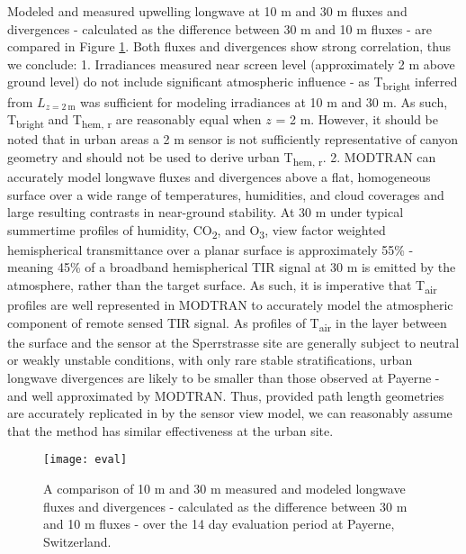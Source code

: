 Modeled and measured upwelling longwave at 10 \si{m} and 30 \si{m} fluxes and divergences - calculated as the difference between 30 \si{\meter} and 10 \si{\meter} fluxes - are compared in Figure \ref{fluxes}. Both fluxes and divergences show strong correlation, thus we conclude: 1. Irradiances measured near screen level (approximately 2 \si{\meter} above ground level) do not include significant atmospheric influence - as T\textsubscript{bright} inferred from $L_{z=2~\si{\meter}}$ was sufficient for modeling irradiances at 10 \si{m} and 30 \si{m}. As such, T\textsubscript{bright} and T\textsubscript{hem, r} are reasonably equal when $z$ = 2 \si{m}. However, it should be noted that in urban areas a 2 \si{m} sensor is not sufficiently representative of canyon geometry and should not be used to derive urban T\textsubscript{hem, r}. 2. MODTRAN can accurately model longwave fluxes and divergences above a flat, homogeneous surface over a wide range of temperatures, humidities, and cloud coverages and large resulting contrasts in near-ground stability. At 30 \si{\meter} under typical summertime profiles of humidity, CO\textsubscript{2}, and O\textsubscript{3}, view factor weighted hemispherical transmittance over a planar surface is approximately 55\% - meaning 45\% of a broadband hemispherical TIR signal at 30 \si{\meter} is emitted by the atmosphere, rather than the target surface. As such, it is imperative that T\textsubscript{air} profiles are well represented in MODTRAN to accurately model the atmospheric component of remote sensed TIR signal. As profiles of T\textsubscript{air} in the layer between the surface and the sensor at the Sperrstrasse site are generally subject to neutral or weakly unstable conditions, with only rare stable stratifications, urban longwave divergences are likely to be smaller than those observed at Payerne - and well approximated by MODTRAN. Thus, provided path length geometries are accurately replicated in by the sensor view model, we can reasonably assume that the method has similar effectiveness at the urban site.

\begin{figure}[H]
	\centering
	\texttt{[image: eval]}
	\caption{A comparison of 10 \si{m} and 30 \si{m} measured and modeled longwave fluxes and divergences - calculated as the difference between 30 \si{\meter} and 10 \si{\meter} fluxes - over the 14 day evaluation period at Payerne, Switzerland.}
	\label{fluxes}
\end{figure}

